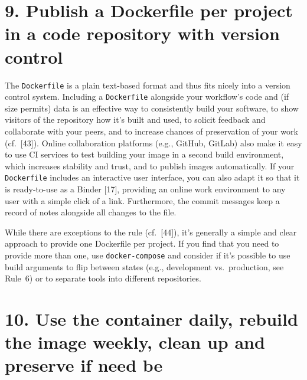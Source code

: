 \documentclass[10pt,letterpaper]{article}
\begin{document}
\hypertarget{publish-a-dockerfile-per-project-in-a-code-repository-with-version-control}{%
\section*{9. Publish a Dockerfile per project in a code repository with
version
control}\label{publish-a-dockerfile-per-project-in-a-code-repository-with-version-control}}

The \texttt{Dockerfile} is a plain text-based format and thus fits
nicely into a version control system. Including a \texttt{Dockerfile}
alongside your workflow's code and (if size permits) data is an
effective way to consistently build your software, to show visitors of
the repository how it's built and used, to solicit feedback and
collaborate with your peers, and to increase chances of preservation of
your work (cf.~{[}43{]}). Online collaboration platforms (e.g., GitHub,
GitLab) also make it easy to use CI services to test building your image
in a second build environment, which increases stability and trust, and
to publish images automatically. If your \texttt{Dockerfile} includes an
interactive user interface, you can also adapt it so that it is
ready-to-use as a Binder {[}17{]}, providing an online work environment
to any user with a simple click of a link. Furthermore, the commit
messages keep a record of notes alongside all changes to the file.

While there are exceptions to the rule (cf.~{[}44{]}), it's generally a
simple and clear approach to provide one Dockerfile per project. If you
find that you need to provide more than one, use \texttt{docker-compose}
and consider if it's possible to use build arguments to flip between
states (e.g., development vs.~production, see Rule~6) or to separate
tools into different repositories.

\hypertarget{use-the-container-daily-rebuild-the-image-weekly-clean-up-and-preserve-if-need-be}{%
\section*{10. Use the container daily, rebuild the image weekly, clean
up and preserve if need
be}\label{use-the-container-daily-rebuild-the-image-weekly-clean-up-and-preserve-if-need-be}}
\end{document}

